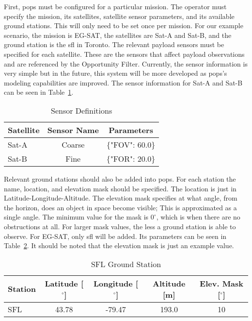 First, \gls{pops} must be configured for a particular mission. The operator
must specify the mission, its satellites, satellite sensor parameters, and its
available ground stations. This will only need to be set once per mission. For
our example scenario, the mission is EG-SAT, the satellites are Sat-A and
Sat-B, and the ground station is the \gls{sfl} in Toronto. The relevant payload
sensors must be specified for each satellite. These are the sensors that affect
payload observations and are referenced by the Opportunity Filter. Currently,
the sensor information is very simple but in the future, this system will be
more developed as \gls{pops}'s modeling capabilities are improved. The sensor
information for Sat-A and Sat-B can be seen in Table~\ref{tab:sensors}. 

\begin{table}[h] 
    \centering
    \caption{Sensor Definitions}
    \begin{tabular}{ccc}
	Satellite                  & Sensor Name & Parameters    \\ \hline
	\multicolumn{1}{l|}{Sat-A} & Coarse      & \{"FOV": 60.0\} \\
	\multicolumn{1}{l|}{Sat-B} & Fine        & \{"FOR": 20.0\}
    \end{tabular}
    \label{tab:sensors}
\end{table}

Relevant ground stations should also be added into \gls{pops}. For each
station the name, location, and elevation mask should be specified. The
location is just in Latitude-Longitude-Altitude. The elevation mask specifies
at what angle, from the horizon, does an object in space become visible; This
is approximated as a single angle. The minimum value for the mask is $0^\circ$,
which is when there are no obstructions at all. For larger mask values, the
less a ground station is able to observe. For EG-SAT, only \gls{sfl} will be
added. Its parameters can be seen in Table~\ref{tab:ground-stations}. It should
be noted that the elevation mask is just an example value.

\begin{table}[h] 
    \centering
    \caption{SFL Ground Station}
    \begin{tabular}{ccccc}
	Station                  & Latitude [$^\circ$] & Longitude [$^\circ$] & Altitude [m] & Elev. Mask [$^\circ$] \\ \hline
	\multicolumn{1}{l|}{SFL} & 43.78   & -79.47   & 193.0  & 10      \\
    \end{tabular}
    \label{tab:ground-stations}
\end{table}

